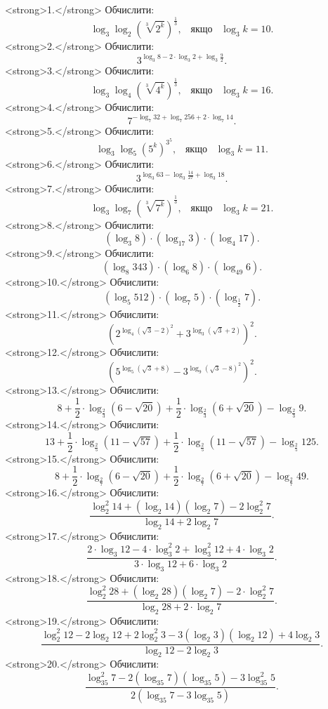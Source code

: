 <strong>1.</strong> Обчислити:
$$\log_{3}\log_{2}\left(\sqrt[3]{2^k}\right)^{\frac{1}{3}}, \;\;\; \mbox{якщо} \;\;\; \log_{3}k=10.$$
<strong>2.</strong> Обчислити:
$$3^{\log_{3}8-2\cdot\log_{3}2+\log_{3}\frac{9}{2}}.$$
<strong>3.</strong> Обчислити:
$$\log_{3}\log_{4}\left(\sqrt[3]{4^k}\right)^{\frac{1}{3}}, \;\;\; \mbox{якщо} \;\;\; \log_{3}k=16.$$
<strong>4.</strong> Обчислити:
$$7^{-\log_{7}32+\log_{7}256+2\cdot\log_{7}14}.$$
<strong>5.</strong> Обчислити:
$$\log_{3}\log_{5}\left(5^k\right)^{3^5}, \;\;\; \mbox{якщо} \;\;\; \log_{3}k=11.$$
<strong>6.</strong> Обчислити:
$$3^{\log_{3}63-\log_{3}\frac{14}{27}+\log_{3}18}.$$
<strong>7.</strong> Обчислити:
$$\log_{3}\log_{7}\left(\sqrt[3]{7^k}\right)^{\frac{1}{3}}, \;\;\; \mbox{якщо} \;\;\; \log_{3}k=21.$$
<strong>8.</strong> Обчислити:
$$\left(\log_{3}8\right)\cdot\left(\log_{17}3\right)\cdot\left(\log_{4}17\right).$$
<strong>9.</strong> Обчислити:
$$\left(\log_{8}343\right)\cdot\left(\log_{6}8\right)\cdot\left(\log_{49}6\right).$$
<strong>10.</strong> Обчислити:
$$\left(\log_{5}512\right)\cdot\left(\log_{7}5\right)\cdot\left(\log_{\frac{1}{2}}7\right).$$
<strong>11.</strong> Обчислити:
$$\left(2^{\log_{4}\left(\sqrt{3}-2\right)^2}+3^{\log_{3}\left(\sqrt{3}+2\right)}\right)^2.$$
<strong>12.</strong> Обчислити:
$$\left(5^{\log_{5}\left(\sqrt{3}+8\right)}-3^{\log_{9}\left(\sqrt{3}-8\right)^2}\right)^2.$$
<strong>13.</strong> Обчислити:
$$8+\dfrac{1}{2}\cdot\log_{\frac{2}{3}}\left(6-\sqrt{20}\right)+\dfrac{1}{2}\cdot\log_{\frac{2}{3}} \left(6+\sqrt{20}\right)-\log_{\frac{2}{3}}9.$$
<strong>14.</strong> Обчислити:
$$13+\dfrac{1}{2}\cdot\log_{\frac{2}{5}}\left(11-\sqrt{57}\right)+\dfrac{1}{2}\cdot\log_{\frac{2}{5}}\left(11-\sqrt{57}\right)-\log_{\frac{2}{5}}125.$$
<strong>15.</strong> Обчислити:
$$8+\dfrac{1}{2}\cdot\log_{\frac{2}{7}}\left(6-\sqrt{20}\right)+\dfrac{1}{2}\cdot\log_{\frac{2}{7}}\left(6+\sqrt{20}\right)-\log_{\frac{2}{7}}49.$$
<strong>16.</strong> Обчислити:
$$\frac{\log^{2}_{2}14+\left(\log_{2}14\right)\left(\log_{2}7\right)-2\log^{2}_{2}7}{\log_{2}14+2\log_{2}7}.$$
<strong>17.</strong> Обчислити:
$$\dfrac{2\cdot\log_{3}12-4\cdot\log^{2}_{3}2+\log^{2}_{3}12+4\cdot\log_{3}2}{3\cdot\log_{3}12+6\cdot\log_{3}2}.$$
<strong>18.</strong> Обчислити:
$$\dfrac{\log^{2}_{2}28+\left(\log_{2}28\right)\left(\log_{2}7\right)-2\cdot\log^{2}_{2}7}{\log_{2}28+2\cdot\log_{2}7}.$$
<strong>19.</strong> Обчислити:
$$\dfrac{\log^{2}_{2}12-2\log_{2}12+2\log^{2}_{2}3-3\left(\log_{2}3\right)\left(\log_{2}12\right)+
4\log_{2}3}{\log_{2}12-2\log_{2}3}.$$
<strong>20.</strong> Обчислити:
$$\dfrac{\log^{2}_{35}7-2\left(\log_{35}7\right)\left(\log_{35}5\right)-3\log^{2}_{35}5}{2\left(\log_{35}7-3\log_{35}5\right)}.$$
